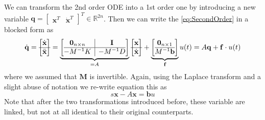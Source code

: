 \documentclass{article}
\begin{document}
	
	We can transform the 2nd order ODE into a 1st order one by introducing a new variable $\textbf{q} = \begin{bmatrix}
		\textbf{x}^T & \dot{\textbf{x}}^T
	\end{bmatrix}^T \in \mathbb{R}^{2n}$. Then we can write the \autoref{eq:SecondOrder} in a blocked form as 
	\begin{equation}\label{eq:equivFirstOrder}
		\dot{\mathbf{q}} = \begin{bmatrix}
			\dot{\textbf{x}} \\\hline \ddot{\textbf{x}}
		\end{bmatrix} =
		\underbrace{\left[\begin{array}{@{}c|c@{}}
		\textbf{0}_{n\times n} & \textbf{I} \\\hline -{M}^{-1} K & -{M}^{-1} D
		\end{array}\right]}_{=A} 
		\begin{bmatrix}
			{\textbf{x}} \\\hline \dot{\textbf{x}}
		\end{bmatrix}
		 + \underbrace{\left[\begin{array}{@{}c@{}}
		\textbf{0}_{n\times 1}  \\\hline {M}^{-1} \textbf{b}
		\end{array}\right]}_{\textbf{f}} u(t)
		= A\mathbf{q}+\mathbf{f}\cdot u(t)
	\end{equation}
	where we assumed that $\textbf{M}$ is invertible.
		Again, using the Laplace transform and a slight abuse of notation we re-write equation this as
	\begin{equation}\label{eq:LaplaceX}
		s\mathbf{x}-A\mathbf{x}=\mathbf{b}u
	\end{equation} 
	Note that after the two transformations introduced before, these variable are linked, but not at all identical to their original counterparts.
	
\end{document}
